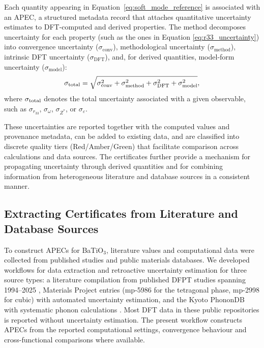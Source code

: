 \documentclass[prb,twocolumn,superscriptaddress,amsmath,amssymb,longbibliography]{revtex4-2}
\begin{document}
Each quantity appearing in Equation~\ref{eq:soft_mode_reference} is associated with an APEC, a structured metadata record that attaches quantitative uncertainty estimates to DFT-computed and derived properties. The method decomposes uncertainty for each property (such as the ones in Equation \ref{eq:r33_uncertainty}) into convergence uncertainty ($\sigma_{\mathrm{conv}}$), methodological uncertainty ($\sigma_{\mathrm{method}}$), intrinsic DFT uncertainty ($\sigma_{\mathrm{DFT}}$), and, for derived quantities, model-form uncertainty ($\sigma_{\mathrm{model}}$):
\begin{equation}
\sigma_{\rm total}
=
\sqrt{
\sigma_{\rm conv}^2+
\sigma_{\rm method}^2+
\sigma_{\rm DFT}^2+
\sigma_{\rm model}^2
}, 
\label{eq:sigma_sum}
\end{equation}
\noindent where $\sigma_{\rm total}$ denotes the total uncertainty
associated with a given observable, such as
$\sigma_{r_{33}}$, $\sigma_{\omega}$,
$\sigma_{Z^*}$, or $\sigma_{\varepsilon}$. 

These uncertainties are reported together with the computed values and provenance metadata, can be added to existing data, and are classified into discrete quality tiers (Red/Amber/Green) that facilitate comparison across calculations and data sources. The certificates further provide a mechanism for propagating uncertainty through derived quantities and for combining information from heterogeneous literature and database sources in a consistent manner.

\subsection{Extracting Certificates from Literature and Database Sources}

To construct APECs for BaTiO$_3$, literature values and computational data were collected from published studies and public materials databases.
 We developed workflows for data extraction and retroactive uncertainty estimation for three 
source types: a literature compilation from published 
DFPT studies spanning 1994--2025 \cite{Baroni2001,Gonze1997_DFPT}, Materials Project entries 
(mp-5986 for the tetragonal phase, mp-2998 for cubic) with automated 
uncertainty estimation, and the Kyoto PhononDB with systematic phonon 
calculations \cite{Togo2015_phonopy,Togo2023_PhononDB}.
Most DFT data in these public repositories is reported without uncertainty 
estimation. The present workflow constructs APECs from the reported computational settings, convergence behaviour and cross-functional comparisons where available. 
\end{document}
